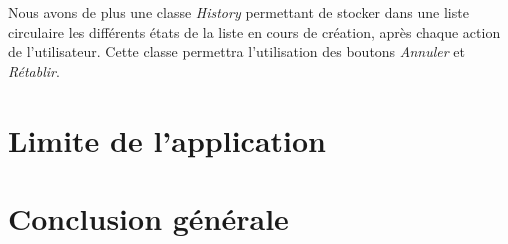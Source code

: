 \documentclass[a4paper,10pt]{article}
\begin{document}
Nous avons de plus une classe \textit{History} permettant de stocker dans une liste circulaire les différents états de la liste en cours de création, après chaque action de l'utilisateur. Cette classe permettra l'utilisation des boutons \textit{Annuler} et \textit{Rétablir}.

\newpage
\section{Limite de l'application}

\newpage
\section{Conclusion générale}
\end{document}

